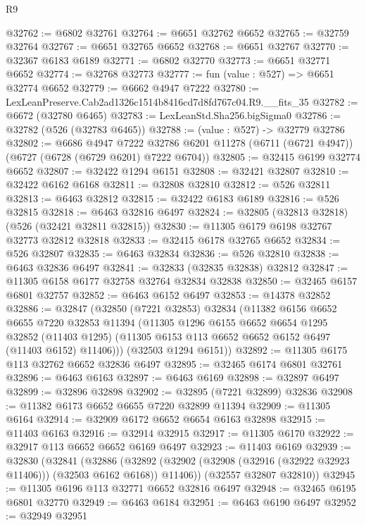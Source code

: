 \begin{lexlean}{R9}
\begin{coremodule}
@32762 := @6802 @32761
@32764 := @6651 @32762 @6652
@32765 := @32759 @32764
@32767 := @6651 @32765 @6652
@32768 := @6651 @32767
@32770 := @32367 @6183 @6189
@32771 := @6802 @32770
@32773 := @6651 @32771 @6652
@32774 := @32768 @32773
@32777 := fun (value : @527) => @6651 @32774 @6652
@32779 := @6662 @4947 @7222
@32780 := LexLeanPreserve.Cab2ad1326c1514b8416cd7d8fd767c04.R9.__fits_35
@32782 := @6672 (@32780 @6465)
@32783 := LexLeanStd.Sha256.bigSigma0
@32786 := @32782 (@526 (@32783 @6465))
@32788 := (value : @527) -> @32779 @32786
@32802 := @6686
    @4947
    @7222
    @32786
    @6201
    @11278
    (@6711 (@6721 @4947))
    (@6727 (@6728 (@6729 @6201) @7222 @6704))
@32805 := @32415 @6199 @32774 @6652
@32807 := @32422 @1294 @6151
@32808 := @32421 @32807
@32810 := @32422 @6162 @6168
@32811 := @32808 @32810
@32812 := @526 @32811
@32813 := @6463 @32812
@32815 := @32422 @6183 @6189
@32816 := @526 @32815
@32818 := @6463 @32816 @6497
@32824 := @32805 (@32813 @32818) (@526 (@32421 @32811 @32815))
@32830 := @11305 @6179 @6198 @32767 @32773 @32812 @32818
@32833 := @32415 @6178 @32765 @6652
@32834 := @526 @32807
@32835 := @6463 @32834
@32836 := @526 @32810
@32838 := @6463 @32836 @6497
@32841 := @32833 (@32835 @32838) @32812
@32847 := @11305 @6158 @6177 @32758 @32764 @32834 @32838
@32850 := @32465 @6157 @6801 @32757
@32852 := @6463 @6152 @6497
@32853 := @14378 @32852
@32886 := @32847
    (@32850
      (@7221 @32853)
      @32834
      (@11382
        @6156
        @6652
        @6655
        @7220
        @32853
        @11394
        (@11305
          @1296
          @6155
          @6652
          @6654
          @1295
          @32852
          (@11403 @1295)
          (@11305 @6153 @113 @6652 @6652 @6152 @6497 (@11403 @6152) @11406)))
      (@32503 @1294 @6151))
@32892 := @11305 @6175 @113 @32762 @6652 @32836 @6497
@32895 := @32465 @6174 @6801 @32761
@32896 := @6463 @6163
@32897 := @6463 @6169
@32898 := @32897 @6497
@32899 := @32896 @32898
@32902 := @32895 (@7221 @32899) @32836
@32908 := @11382 @6173 @6652 @6655 @7220 @32899 @11394
@32909 := @11305 @6164
@32914 := @32909 @6172 @6652 @6654 @6163 @32898
@32915 := @11403 @6163
@32916 := @32914 @32915
@32917 := @11305 @6170
@32922 := @32917 @113 @6652 @6652 @6169 @6497
@32923 := @11403 @6169
@32939 := @32830
    (@32841
      (@32886
        (@32892 (@32902 (@32908 (@32916 (@32922 @32923 @11406))) (@32503 @6162 @6168)) @11406))
      (@32557 @32807 @32810))
@32945 := @11305 @6196 @113 @32771 @6652 @32816 @6497
@32948 := @32465 @6195 @6801 @32770
@32949 := @6463 @6184
@32951 := @6463 @6190 @6497
@32952 := @32949 @32951

\end{coremodule}
\end{lexlean}
